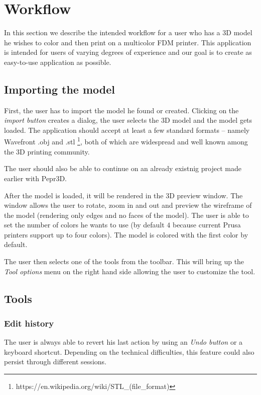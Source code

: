 \section{Workflow}

In this section we describe the intended workflow for a user who has a 3D model he wishes to color and then print on a multicolor FDM printer. This application is intended for users of varying degrees of experience and our goal is to create as easy-to-use application as possible.

\subsection{Importing the model}

First, the user has to import the model he found or created. Clicking on the \textit{import button} creates a dialog, the user selects the 3D model and the model gets loaded. The application should accept at least a few standard formats -- namely Wavefront $.$obj and $.$stl \footnote{https://en.wikipedia.org/wiki/STL\_(file\_format)}, both of which are widespread and well known among the 3D printing community.

The user should also be able to continue on an already existnig project made earlier with Pepr3D.

After the model is loaded, it will be rendered in the 3D preview window. The window allows the user to rotate, zoom in and out and preview the wireframe of the model (rendering only edges and no faces of the model). The user is able to set the number of colors he wants to use (by default $4$ because current Prusa printers support up to four colors). The model is colored with the first color by default.

The user then selects one of the tools from the toolbar. This will bring up the \textit{Tool options} menu on the right hand side allowing the user to customize the tool.

\subsection{Tools}

\subsubsection{Edit history}
The user is always able to revert his last action by using an \textit{Undo button} or a keyboard shortcut. Depending on the technical difficulties, this feature could also persist through different sessions.

